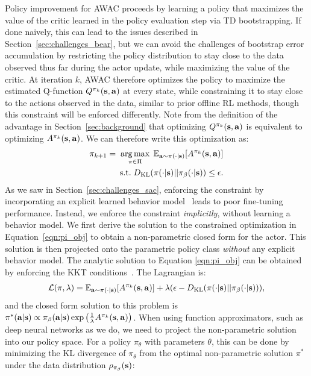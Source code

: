 \documentclass[conference]{IEEEtran}
\begin{document}
Policy improvement for AWAC proceeds by learning a policy that maximizes the value of the critic learned in the policy evaluation step via TD bootstrapping. If done naively, this can lead to the issues described in Section~\ref{sec:challenges_bear}, but we can avoid the challenges of bootstrap error accumulation by restricting the policy distribution to stay close to the data observed thus far during the actor update, while maximizing the value of the critic. At iteration $k$, AWAC therefore optimizes the policy to maximize the estimated Q-function $Q^{\pi_k}(\mathbf{s}, \mathbf{a})$ at every state, while constraining it to stay close to the actions observed in the data, similar to prior offline RL methods, though this constraint will be enforced differently. Note from the definition of the advantage in Section~\ref{sec:background} that optimizing $Q^{\pi_k}(\mathbf{s}, \mathbf{a})$ is equivalent to optimizing $A^{\pi_k}(\mathbf{s}, \mathbf{a})$. We can therefore write this optimization as:
\begin{align} \label{eqn:pi_obj}
    \pinew = \; \argmax_{\pi \in \Pi} \;  \E_{\at \sim \pi(\cdot|\st)}[A^{\pi_k}(\st, \at)] \\
    \text{s.t.} \; \KL(\pi(\cdot|\st)||\pi_\buffer(\cdot|\st)) \leq \epsilon.
\end{align} 
As we saw in Section~\ref{sec:challenges_sac}, enforcing the constraint by incorporating an explicit learned behavior model~\citep{kumar19bear, fujimoto19bcq, wu2019brac, siegel2020abm} leads to poor fine-tuning performance. Instead, we enforce the constraint \emph{implicitly}, without learning a behavior model. We first derive the solution to the constrained optimization in Equation~\ref{eqn:pi_obj} to obtain a non-parametric closed form for the actor. This solution is then projected onto the parametric policy class \emph{without} any explicit behavior model. 
The analytic solution to Equation \ref{eqn:pi_obj} can be obtained by enforcing the KKT conditions~\citep{peters2007rwr, peters2010reps, peng2019awr}. The Lagrangian is:
\begin{align}
    \mathcal{L}(\pi, \lambda) = \mathbb{E}_{\mathbf{a} \sim \pi(\cdot|\mathbf{s})}[A^{\pi_k}(\mathbf{s}, \mathbf{a})] + \lambda(\epsilon - D_{\mathrm{KL}}(\pi(\cdot|\mathbf{s})||{\pi_\beta}(\cdot|\mathbf{s}))),
\end{align}
and the closed form solution to this problem is
$\pi^*(\mathbf{a}|\mathbf{s}) \propto \pi_\beta(\mathbf{a}|\mathbf{s})\exp\left(\frac{1}{\lambda} A^{\pi_k}(\mathbf{s}, \mathbf{a})\right)$.
When using function approximators, such as deep neural networks as we do, we need to project the non-parametric solution into our policy space. For a policy $\pi_\theta$ with parameters $\theta$, this can be done by minimizing the KL divergence of $\pi_{\theta}$ from the optimal non-parametric solution $\pi^*$ under the data distribution $\rho_{\pi_\beta}(\mathbf{s})$: 
\end{document}
